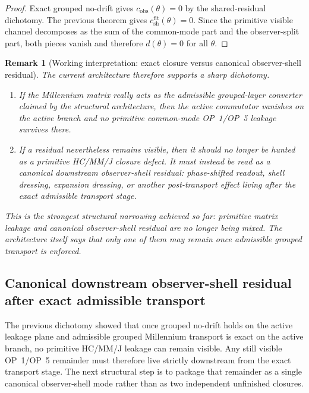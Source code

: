 \documentclass[12pt,a4paper]{article}
\newtheorem{remark}[theorem]{Remark}
\begin{document}
\begin{proof}
Exact grouped no-drift gives $c_{\mathrm{obs}}(\theta)=0$ by the shared-residual dichotomy. The previous theorem gives $c_{\mathrm{sh}}^{\mathrm{fit}}(\theta)=0$. Since the primitive visible channel decomposes as the sum of the common-mode part and the observer-split part, both pieces vanish and therefore $d(\theta)=0$ for all $\theta$.
\end{proof}

\begin{remark}[Working interpretation: exact closure versus canonical observer-shell residual]
The current architecture therefore supports a sharp dichotomy.
\begin{enumerate}[leftmargin=2em,label=(\roman*)]
\item If the Millennium matrix really acts as the admissible grouped-layer converter claimed by the structural architecture, then the active commutator vanishes on the active branch and no primitive common-mode OP~1/OP~5 leakage survives there.
\item If a residual nevertheless remains visible, then it should no longer be hunted as a primitive HC/MM/J closure defect. It must instead be read as a canonical downstream observer-shell residual: phase-shifted readout, shell dressing, expansion dressing, or another post-transport effect living after the exact admissible transport stage.
\end{enumerate}
This is the strongest structural narrowing achieved so far: primitive matrix leakage and canonical observer-shell residual are no longer being mixed. The architecture itself says that only one of them may remain once admissible grouped transport is enforced.
\end{remark}


\subsection*{Canonical downstream observer-shell residual after exact admissible transport}
The previous dichotomy showed that once grouped no-drift holds on the active leakage plane and admissible grouped Millennium transport is exact on the active branch, no primitive HC/MM/J leakage can remain visible. Any still visible OP~1/OP~5 remainder must therefore live strictly downstream from the exact transport stage. The next structural step is to package that remainder as a single canonical observer-shell mode rather than as two independent unfinished closures.
\end{document}

